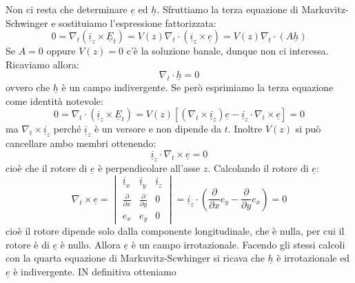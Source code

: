 \documentclass{book}
\begin{document}
    Non ci resta che determinare $\underline{e}$ ed $\underline{h}$. Sfruttiamo la terza equazione di Markuvitz-Schwinger
    e sostituiamo l'espressione fattorizzata:
    \begin{equation}
        0 = \nabla_{t} (\underline{i}_{z} \times \underline{E}_{t})= V(z)\nabla_{t} \cdot (\underline{i}_{z} \times \underline{e}) = V(z) \nabla_{t} \cdot(A\underline{h})
    \end{equation}
    Se $A=0$ oppure $V(z)=0$ c'è la soluzione banale, dunque non ci interessa. Ricaviamo allora:
    \begin{equation}
        \nabla_{t} \cdot \underline{h} = 0
    \end{equation}
    ovvero che $\underline{h}$ è un campo indivergente. Se però esprimiamo la terza equazione come identità notevole:
    \begin{equation}
        0 = \nabla_{t} \cdot (\underline{i}_{z} \times \underline{E}_{t}) =V(z)[(\nabla_{t} \times \underline{i}_{z})\underline{e} - \underline{i}_{z} \cdot \nabla_{t} \times \underline{e}] = 0
    \end{equation}
    ma $\nabla_{t} \times \underline{i}_{z}$ perché $\underline{i}_{z}$ è un versore e non dipende da $t$. Inoltre $V(z)$ si può cancellare ambo membri ottenendo:
    \begin{equation}
        \underline{i}_{z} \cdot \nabla_{t} \times \underline{e} = 0
    \end{equation}
    cioè che il rotore di $\underline{e}$ è perpendicolare all'asse $z$. Calcolando il rotore di $\underline{e}$:
    \begin{equation}
        \nabla_{t} \times \underline{e} = 
        \begin{vmatrix} 
            \underline{i}_{x} & \underline{i}_{y} & \underline{i}_{z} \\
            \displaystyle \frac{\partial}{\partial x} & \displaystyle \frac{\partial}{\partial y} & 0 \\
            e_{x} & e_{y} & 0
        \end{vmatrix} = \underline{i}_{z} \cdot (\frac{\partial}{\partial x}e_{y}-\frac{\partial}{\partial y}e_{x}) = 0
    \end{equation}
    cioè il rotore dipende solo dalla componente longitudinale, che è nulla, per cui il rotore è di $\underline{e}$ è nullo. 
    Allora $\underline{e}$ è un campo irrotazionale. Facendo gli stessi calcoli con la quarta equazione di Markuvitz-Scwhinger si ricava che $\underline{h}$ è irrotazionale
    ed $\underline{e}$ è indivergente. IN definitiva otteniamo
\end{document}
